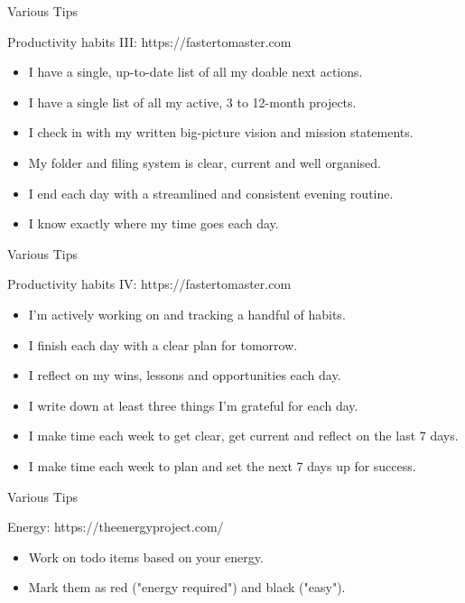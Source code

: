 \begin{frame}{Various Tips}
  \begin{block}{Productivity habits III: https://fastertomaster.com}
    \begin{itemize}
      \item I have a single, up-to-date list of all my doable next actions.
      \item I have a single list of all my active, 3 to 12-month projects.
      \item I check in with my written big-picture vision and mission statements.
      \item My folder and filing system is clear, current and well organised.
      \item I end each day with a streamlined and consistent evening routine.
      \item I know exactly where my time goes each day.
    \end{itemize}
  \end{block}
\end{frame}

\begin{frame}{Various Tips}
  \begin{block}{Productivity habits IV: https://fastertomaster.com}
    \begin{itemize}
      \item I'm actively working on and tracking a handful of habits.
      \item I finish each day with a clear plan for tomorrow. 
      \item I reflect on my wins, lessons and opportunities each day.
      \item I write down at least three things I’m grateful for each day.
      \item I make time each week to get clear, get current and reflect on the last 7 days.
      \item I make time each week to plan and set the next 7 days up for success.
    \end{itemize}
  \end{block}
\end{frame}

\begin{frame}{Various Tips}
  \begin{block}{Energy: https://theenergyproject.com/}
    \begin{itemize}
      \item Work on todo items based on your energy.
      \item Mark them as red ("energy required") and black ("easy").
    \end{itemize}
  \end{block}
\end{frame}

